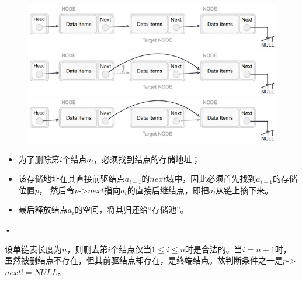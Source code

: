  
\begin{frame}
\begin{figure}
\centering
\includegraphics[width=4.5in]{Chapters/Ch02/Fig/linked_list_deletion_0.jpg}\\[0.1cm]\pause 
\includegraphics[width=4.5in]{Chapters/Ch02/Fig/linked_list_deletion_1.jpg}\\[0.1cm]\pause 
\includegraphics[width=4.5in]{Chapters/Ch02/Fig/linked_list_deletion_2.jpg}
\end{figure}
\end{frame}


\begin{frame}
\begin{itemize}
\item 为了删除第$i$个结点$a_i$，必须找到结点的存储地址；
\item 该存储地址在其直接前驱结点$a_{i-1}$的$next$域中，因此必须首先找到$a_{i-1}$的存储位置$p$，
然后令$p$->$next$指向$a_i$的直接后继结点，即把$a_i$从链上摘下来。
\item
最后释放结点$a_i$的空间，将其归还给“存储池”。
\end{itemize}•

\end{frame}


\begin{frame}
设单链表长度为$n$，则删去第$i$个结点仅当$1\le i \le n$时是合法的。当$i=n+1$时，虽然被删结点不存在，但其前驱结点却存在，是终端结点。故判断条件之一是$p$->$next!=NULL$。

\end{frame}

\begin{frame}[fragile]

\end{frame}


